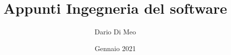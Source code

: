 \documentclass[a4paper,11pt]{article}
\title{\textbf{Appunti Ingegneria del software}}
\author{Dario Di Meo}
\date{Gennaio 2021}
\begin{document}
\newcommand{\sw}[0]{software}
\newcommand{\Sw}[0]{Software}
\maketitle
\tableofcontents
\newpage

\newpage

\newpage

\end{document}
